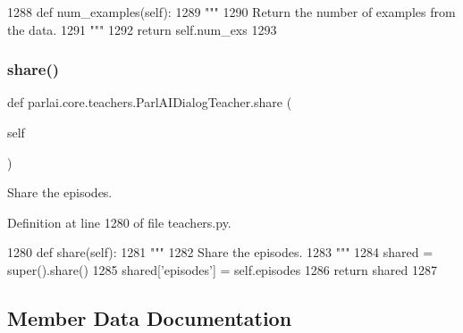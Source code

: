 \begin{DoxyCode}
1288     \textcolor{keyword}{def }num\_examples(self):
1289         \textcolor{stringliteral}{"""}
1290 \textcolor{stringliteral}{        Return the number of examples from the data.}
1291 \textcolor{stringliteral}{        """}
1292         \textcolor{keywordflow}{return} self.num\_exs
1293 
\end{DoxyCode}
\mbox{\label{classparlai_1_1core_1_1teachers_1_1ParlAIDialogTeacher_a9e2eabf923a38b53865705786e07f461}} 
\subsubsection{\texorpdfstring{share()}{share()}}
{\footnotesize\ttfamily def parlai.\+core.\+teachers.\+Parl\+A\+I\+Dialog\+Teacher.\+share (\begin{DoxyParamCaption}\item[{}]{self }\end{DoxyParamCaption})}

\begin{DoxyVerb}Share the episodes.
\end{DoxyVerb}
 

Definition at line 1280 of file teachers.\+py.


\begin{DoxyCode}
1280     \textcolor{keyword}{def }share(self):
1281         \textcolor{stringliteral}{"""}
1282 \textcolor{stringliteral}{        Share the episodes.}
1283 \textcolor{stringliteral}{        """}
1284         shared = super().share()
1285         shared[\textcolor{stringliteral}{'episodes'}] = self.episodes
1286         \textcolor{keywordflow}{return} shared
1287 
\end{DoxyCode}


\subsection{Member Data Documentation}
\mbox{\label{classparlai_1_1core_1_1teachers_1_1ParlAIDialogTeacher_a99d92211286cdcc382f723ebc9d272c4}} 
